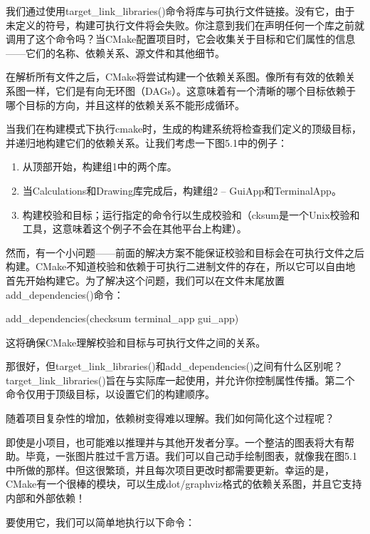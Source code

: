 我们通过使用target\_link\_libraries()命令将库与可执行文件链接。没有它，由于未定义的符号，构建可执行文件将会失败。你注意到我们在声明任何一个库之前就调用了这个命令吗？当CMake配置项目时，它会收集关于目标和它们属性的信息——它们的名称、依赖关系、源文件和其他细节。

在解析所有文件之后，CMake将尝试构建一个依赖关系图。像所有有效的依赖关系图一样，它们是有向无环图（DAGs）。这意味着有一个清晰的哪个目标依赖于哪个目标的方向，并且这样的依赖关系不能形成循环。

当我们在构建模式下执行cmake时，生成的构建系统将检查我们定义的顶级目标，并递归地构建它们的依赖关系。让我们考虑一下图5.1中的例子：

\begin{enumerate}
\item
从顶部开始，构建组1中的两个库。

\item
当Calculations和Drawing库完成后，构建组2 – GuiApp和TerminalApp。

\item
 构建校验和目标；运行指定的命令行以生成校验和（cksum是一个Unix校验和工具，这意味着这个例子不会在其他平台上构建）。
\end{enumerate}

然而，有一个小问题——前面的解决方案不能保证校验和目标会在可执行文件之后构建。CMake不知道校验和依赖于可执行二进制文件的存在，所以它可以自由地首先开始构建它。为了解决这个问题，我们可以在文件末尾放置add\_dependencies()命令：

\begin{cmake}
add_dependencies(checksum terminal_app gui_app)
\end{cmake}

这将确保CMake理解校验和目标与可执行文件之间的关系。

那很好，但target\_link\_libraries()和add\_dependencies()之间有什么区别呢？target\_link\_libraries()旨在与实际库一起使用，并允许你控制属性传播。第二个命令仅用于顶级目标，以设置它们的构建顺序。

随着项目复杂性的增加，依赖树变得难以理解。我们如何简化这个过程呢？


即使是小项目，也可能难以推理并与其他开发者分享。一个整洁的图表将大有帮助。毕竟，一张图片胜过千言万语。我们可以自己动手绘制图表，就像我在图5.1中所做的那样。但这很繁琐，并且每次项目更改时都需要更新。幸运的是，CMake有一个很棒的模块，可以生成dot/graphviz格式的依赖关系图，并且它支持内部和外部依赖！

要使用它，我们可以简单地执行以下命令：

